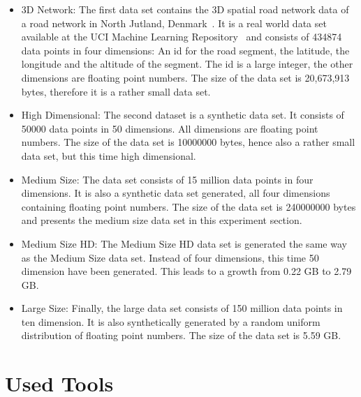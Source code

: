 \begin{itemize} 
\item 3D Network: The first data set contains the 3D spatial road network data of a road network in North Jutland, Denmark~\parencite{3dnet}. It is a real world data set available at the UCI Machine Learning Repository~\parencite{uci} and consists of 434874 data points in four dimensions: An id for the road segment, the latitude, the longitude and the altitude of the segment. The id is a large integer, the other dimensions are floating point numbers. The size of the data set is 20,673,913 bytes, therefore it is a rather small data set.

\item High Dimensional: The second dataset is a synthetic data set. It consists of 50000 data points in 50 dimensions. All dimensions are floating point numbers. The size of the data set is 10000000 bytes, hence also a rather small data set, but this time high dimensional.

\item Medium Size: The data set consists of 15 million data points in four dimensions. It is also a synthetic data set generated, all four dimensions containing floating point numbers. The size of the data set is 240000000 bytes and presents the medium size data set in this experiment section.

\item Medium Size HD: The Medium Size HD data set is generated the same way as the Medium Size data set. Instead of four dimensions, this time 50 dimension have been generated. This leads to a growth from 0.22 GB to 2.79 GB.  

\item Large Size: Finally, the large data set consists of 150 million data points in ten dimension. It is also synthetically generated by a random uniform distribution of floating point numbers. The size of the data set is 5.59 GB.
\end{itemize} 



\section{Used Tools}


